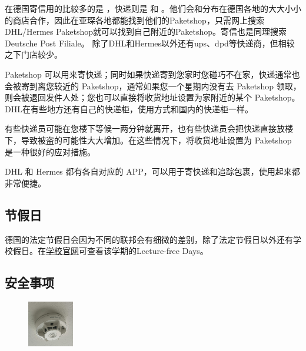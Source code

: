     在德国寄信用的比较多的是 \href{https://www.deutschepost.de/de.html}{}，快递则是 \href{https://www.dhl.de/de/privatkunden.html}{} 和 \href{https://www.myhermes.de/}{}。他们会和分布在德国各地的大大小小的商店合作，因此在亚琛各地都能找到他们的Paketshop，只需网上搜索DHL/Hermes Paketshop就可以找到自己附近的Paketshop。寄信也是同理搜索Deutsche Post Filiale。 除了DHL和Hermes以外还有ups、dpd等快递商，但相较之下门店较少。

    Paketshop 可以用来寄快递；同时如果快递寄到您家时您碰巧不在家，快递通常也会被寄到离您较近的 Paketshop，通常如果您一个星期内没有去 Paketshop 领取，则会被退回发件人处；您也可以直接将收货地址设置为家附近的某个 Paketshop。DHL在有些地方还有自己的快递柜，使用方式和国内的快递柜一样。

    有些快递员可能在您楼下等候一两分钟就离开，也有些快递员会把快递直接放楼下，导致被盗的可能性大大增加。在这些情况下，将收货地址设置为 Paketshop 是一种很好的应对措施。

    DHL 和 Hermes 都有各自对应的 APP，可以用于寄快递和追踪包裹，使用起来都非常便捷。

  \subsection{节假日}\label{subsec:节假日}

    德国的法定节假日会因为不同的联邦会有细微的差别，除了法定节假日以外还有学校假日。在\href{https://www.rwth-aachen.de/cms/root/Studium/Im-Studium/~egv/Semestertermine/lidx/1/}{学校官网}可查看该学期的Lecture-free Days。

  \subsection{安全事项}\label{subsec:安全事项}

    \begin{figure}
      \begin{center}
        \includegraphics[width=0.18\textwidth]{在亚琛学习和生活/生活的一切琐碎问题/烟雾报警器.jpg}
      \end{center}
    \end{figure}

